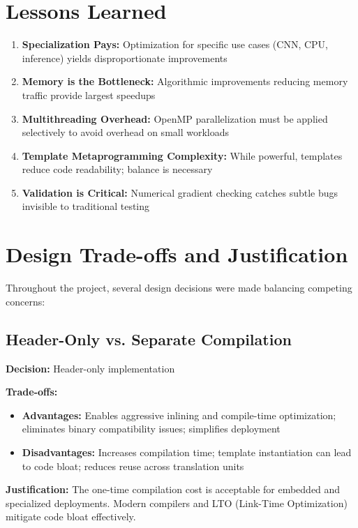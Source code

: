 \documentclass[12pt,oneside,a4paper]{report}
\begin{document}
\section{Lessons Learned}

\begin{enumerate}
    \item \textbf{Specialization Pays:} Optimization for specific use cases (CNN, CPU, inference) yields disproportionate improvements
    \item \textbf{Memory is the Bottleneck:} Algorithmic improvements reducing memory traffic provide largest speedups
    \item \textbf{Multithreading Overhead:} OpenMP parallelization must be applied selectively to avoid overhead on small workloads
    \item \textbf{Template Metaprogramming Complexity:} While powerful, templates reduce code readability; balance is necessary
    \item \textbf{Validation is Critical:} Numerical gradient checking catches subtle bugs invisible to traditional testing
\end{enumerate}

\section{Design Trade-offs and Justification}

Throughout the project, several design decisions were made balancing competing concerns:

\subsection{Header-Only vs. Separate Compilation}

\textbf{Decision:} Header-only implementation

\textbf{Trade-offs:}
\begin{itemize}
    \item \textbf{Advantages:} Enables aggressive inlining and compile-time optimization; eliminates binary compatibility issues; simplifies deployment
    \item \textbf{Disadvantages:} Increases compilation time; template instantiation can lead to code bloat; reduces reuse across translation units
\end{itemize}

\textbf{Justification:} The one-time compilation cost is acceptable for embedded and specialized deployments. Modern compilers and LTO (Link-Time Optimization) mitigate code bloat effectively.
\end{document}
